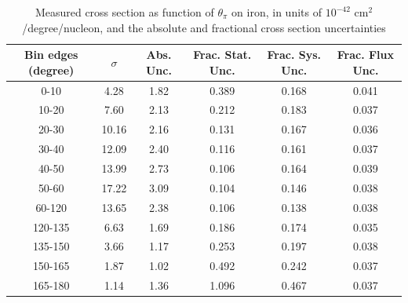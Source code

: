 \documentclass[../main.tex]{subfiles}
\begin{document}
\pagebreak
\begin{turnpage}
\end{turnpage}
\begin{table}
  \centering
  \renewcommand{\arraystretch}{1.15}
  \caption{Measured cross section as function of $\theta_{\pi}$ on iron, in units of $10^{-42}$ $\text{cm}^2$/degree/nucleon, and the absolute and fractional cross section uncertainties}
    \begin{tabular}{c||c|c||c|c|c}
      Bin edges (degree) &  $\sigma$  &  Abs. Unc.  &  Frac. Stat. Unc.  &  Frac. Sys. Unc.  &  Frac. Flux Unc. \\
      \hline
      \hline
      0-10 & 4.28 & 1.82 & 0.389 & 0.168 & 0.041\\
      10-20 & 7.60 & 2.13 & 0.212 & 0.183 & 0.037\\
      20-30 & 10.16 & 2.16 & 0.131 & 0.167 & 0.036\\
      30-40 & 12.09 & 2.40 & 0.116 & 0.161 & 0.037\\
      40-50 & 13.99 & 2.73 & 0.106 & 0.164 & 0.039\\
      50-60 & 17.22 & 3.09 & 0.104 & 0.146 & 0.038\\
      60-120 & 13.65 & 2.38 & 0.106 & 0.138 & 0.038\\
      120-135 & 6.63 & 1.69 & 0.186 & 0.174 & 0.035\\
      135-150 & 3.66 & 1.17 & 0.253 & 0.197 & 0.038\\
      150-165 & 1.87 & 1.02 & 0.492 & 0.242 & 0.037\\
      165-180 & 1.14 & 1.36 & 1.096 & 0.467 & 0.037
    \end{tabular}
  \label{tbl:datanucleonnuc26pion_thetaa}
\end{table}
\pagebreak
\end{document}
